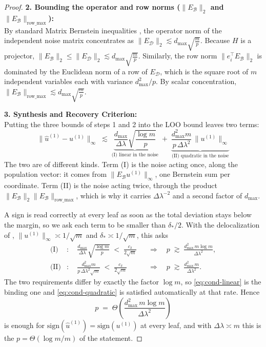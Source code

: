\documentclass[11pt]{article}
\begin{document}
\begin{proof}
\textbf{2. Bounding the operator and row norms ($\|E_{\mathcal{B}}\|_2$ and $\|E_{\mathcal{B}}\|_{\text{row\_max}}$):} \\
By standard Matrix Bernstein inequalities \cite{tropp2012}, the operator norm of the independent noise matrix concentrates as $\|E_{\mathcal{D}}\|_2 \lesssim d_{\max} \sqrt{\frac{m}{p}}$. Because $H$ is a projector, $\|E_{\mathcal{B}}\|_2 \le \|E_{\mathcal{D}}\|_2 \lesssim d_{\max} \sqrt{\frac{m}{p}}$. 
Similarly, the row norm $\|e_i^\top E_{\mathcal{B}}\|_2$ is dominated by the Euclidean norm of a row of $E_{\mathcal{D}}$, which is the square root of $m$ independent variables each with variance $d_{\max}^2/p$. By scalar concentration, $\|E_{\mathcal{B}}\|_{\text{row\_max}} \lesssim d_{\max} \sqrt{\frac{m}{p}}$.

\textbf{3. Synthesis and Recovery Criterion:} \\
Putting the three bounds of steps 1 and 2 into the LOO bound leaves two terms:
\begin{equation}
\label{eq:two-terms}
\|\hat{u}^{(1)} - u^{(1)}\|_\infty \;\lesssim\;
\underbrace{\frac{d_{\max}}{\Delta\lambda} \sqrt{\frac{\log m}{p}}}_{\text{(I) linear in the noise}}
\;+\;
\underbrace{\frac{d_{\max}^2 m}{p \, \Delta\lambda^2} \, \|u^{(1)}\|_\infty}_{\text{(II) quadratic in the noise}}
\end{equation}
The two are of different kinds. Term (I) is the noise acting once, along the population
vector: it comes from $\|E_{\mathcal{B}} u^{(1)}\|_\infty$, one Bernstein sum per
coordinate. Term (II) is the noise acting twice, through the product
$\|E_{\mathcal{B}}\|_2 \|E_{\mathcal{B}}\|_{\text{row\_max}}$, which is why it carries
$\Delta\lambda^{-2}$ and a second factor of $d_{\max}$.

A sign is read correctly at every leaf as soon as the total deviation stays below the
margin, so we ask each term to be smaller than $\delta_*/2$. With the delocalization of
, $\|u^{(1)}\|_\infty \asymp 1/\sqrt{m}$ and $\delta_* \asymp
1/\sqrt{m}$, this asks
\begin{align}
\text{(I)} &: \quad \frac{d_{\max}}{\Delta\lambda} \sqrt{\frac{\log m}{p}}
   \;<\; \frac{c_\delta}{2\sqrt{m}}
   &&\Longrightarrow\quad p \;\gtrsim\; \frac{d_{\max}^2 \, m \log m}{\Delta\lambda^2},
   \label{eq:cond-linear} \\[2pt]
\text{(II)} &: \quad \frac{d_{\max}^2 m}{p \, \Delta\lambda^2 \sqrt{m}}
   \;<\; \frac{c_\delta}{2\sqrt{m}}
   &&\Longrightarrow\quad p \;\gtrsim\; \frac{d_{\max}^2 \, m}{\Delta\lambda^2}.
   \label{eq:cond-quadratic}
\end{align}
The two requirements differ by exactly the factor $\log m$, so \eqref{eq:cond-linear} is
the binding one and \eqref{eq:cond-quadratic} is satisfied automatically at that rate.
Hence
\begin{equation}
p \;=\; \Theta\!\left( \frac{d_{\max}^2 \, m \log m}{\Delta\lambda^2} \right)
\end{equation}
is enough for $\mathrm{sign}(\hat{u}^{(1)}) = \mathrm{sign}(u^{(1)})$ at every leaf, and
with $\Delta\lambda \asymp m$ this is the $p = \Theta(\log m / m)$ of the statement.
\end{proof}
\end{document}
